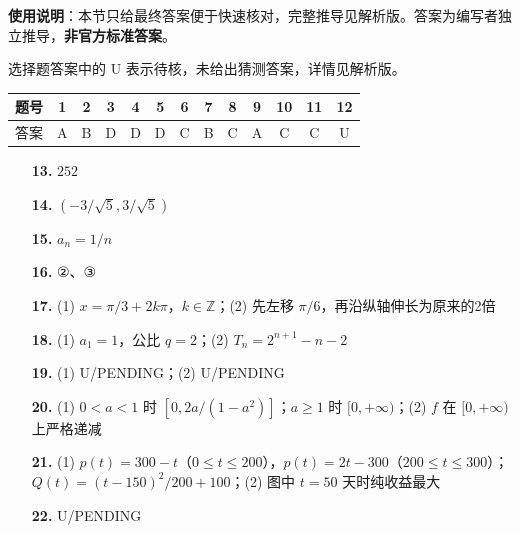
\begin{gknotice}
\textbf{使用说明}：本节只给最终答案便于快速核对，完整推导见解析版。答案为编写者独立推导，\textbf{非官方标准答案}。
\end{gknotice}

\begin{gknotice}
选择题答案中的 U 表示待核，未给出猜测答案，详情见解析版。
\end{gknotice}

\begin{center}\begin{tabular}{ccccccccccccc}
\toprule
题号 & 1 & 2 & 3 & 4 & 5 & 6 & 7 & 8 & 9 & 10 & 11 & 12 \\
\midrule
答案 & A & B & D & D & D & C & B & C & A & C & C & U \\
\bottomrule
\end{tabular}\end{center}

\begin{itemize}[leftmargin=2.6em]
  \item[\textbf{13.}] $252$
  \item[\textbf{14.}] $(-3/\sqrt5,3/\sqrt5)$
  \item[\textbf{15.}] $a_n=1/n$
  \item[\textbf{16.}] ②、③
\end{itemize}

\begin{itemize}[leftmargin=2.6em]
  \item[\textbf{17.}] (1) $x=\pi/3+2k\pi$，$k\in\mathbb Z$；(2) 先左移 $\pi/6$，再沿纵轴伸长为原来的2倍
  \item[\textbf{18.}] (1) $a_1=1$，公比 $q=2$；(2) $T_n=2^{n+1}-n-2$
  \item[\textbf{19.}] (1) U/PENDING；(2) U/PENDING
  \item[\textbf{20.}] (1) $0<a<1$ 时 $[0,2a/(1-a^2)]$；$a\ge1$ 时 $[0,+\infty)$；(2) $f$ 在 $[0,+\infty)$ 上严格递减
  \item[\textbf{21.}] (1) $p(t)=300-t$（$0\le t\le200$），$p(t)=2t-300$（$200\le t\le300$）；$Q(t)=(t-150)^2/200+100$；(2) 图中 $t=50$ 天时纯收益最大
  \item[\textbf{22.}] U/PENDING
\end{itemize}
